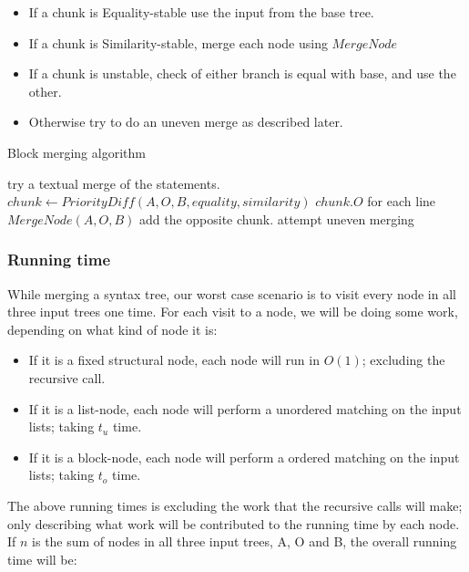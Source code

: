 \documentclass[11pt]{article}
\begin{document}
\begin{itemize}
	\item If a chunk is Equality-stable use the input from the base tree.
	\item If a chunk is Similarity-stable, merge each node using $MergeNode$
	\item If a chunk is unstable, check of either branch is equal with base, and use the other.
	\item Otherwise try to do an uneven merge as described later.
\end{itemize}

\begin{algorithm}
  \caption{Block merging algorithm}
  \label{MergeStatementList}
\begin{algorithmic}
    \State try  a textual merge of the statements.
        \State $chunk \gets PriorityDiff(A, O, B, equality, similarity)$
                \State \Return $chunk.O$
                \State for each line \Return $MergeNode(A, O, B)$
                \State add the opposite chunk.
            \Else
                \State attempt uneven merging
            \EndIf
        \EndFor
    \EndIf
\EndFunction
\end{algorithmic}
\end{algorithm}

\subsubsection{Running time}
While merging a syntax tree, our worst case scenario is to visit every node in all three input trees one time. For each visit to a node, we will be doing some work, depending on what kind of node it is:

\begin{itemize}
\item If it is a fixed structural node, each node will run in $O(1)$; excluding the recursive call.
\item If it is a list-node, each node will perform a unordered matching on the input lists; taking $t_u$ time.
\item If it is a block-node, each node will perform a ordered matching on the input lists; taking $t_o$ time.
\end{itemize}

The above running times is excluding the work that the recursive calls will make; only describing what work will be contributed to the running time by each node. If $n$ is the sum of nodes in all three input trees, A, O and B, the overall running time will be:
\end{document}
